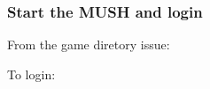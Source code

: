 \documentclass[letterpaper,10pt,english]{sphinxmanual}
\begin{document}
\subsubsection{Start the MUSH and login}
\label{\detokenize{installation:start-the-mush-and-login}}
\sphinxAtStartPar
From the game diretory issue:

\begin{sphinxVerbatim}[commandchars=\\\{\}]
\end{sphinxVerbatim}

\sphinxAtStartPar
To login:

\begin{sphinxVerbatim}[commandchars=\\\{\}]
  
\end{sphinxVerbatim}
\end{document}
